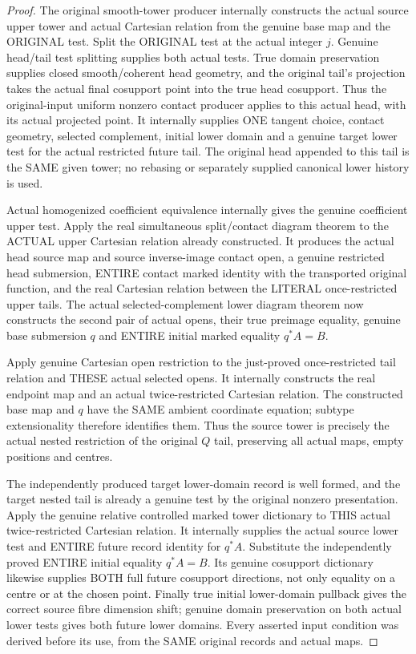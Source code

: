 \begin{proof}
The original smooth-tower producer internally constructs the actual source
upper tower and actual Cartesian relation from the genuine base map and the
ORIGINAL test. Split the ORIGINAL test at the actual integer $j$. Genuine
head/tail test splitting supplies both actual tests. True domain preservation
supplies closed smooth/coherent head geometry, and the original tail's
projection takes the actual final cosupport point into the true head
cosupport. Thus the original-input uniform nonzero contact producer applies
to this actual head, with its actual projected point. It internally supplies
ONE tangent choice, contact geometry, selected complement, initial lower
domain and a genuine target lower test for the actual restricted future tail.
The original head appended to this tail is the SAME given tower; no rebasing
or separately supplied canonical lower history is used.

Actual homogenized coefficient equivalence internally gives the genuine
coefficient upper test. Apply the real simultaneous split/contact diagram
theorem to the ACTUAL upper Cartesian relation already constructed. It
produces the actual head source map and source inverse-image contact open,
a genuine restricted head submersion, ENTIRE contact marked identity with
the transported original function, and the real Cartesian relation between
the LITERAL once-restricted upper tails. The actual selected-complement
lower diagram theorem now constructs the second pair of actual opens, their
true preimage equality, genuine base submersion $q$ and ENTIRE initial
marked equality $q^*A=B$.

Apply genuine Cartesian open restriction to the just-proved once-restricted
tail relation and THESE actual selected opens. It internally constructs the
real endpoint map and an actual twice-restricted Cartesian relation. The
constructed base map and $q$ have the SAME ambient coordinate equation;
subtype extensionality therefore identifies them. Thus the source tower is
precisely the actual nested restriction of the original $Q$ tail, preserving
all actual maps, empty positions and centres.

The independently produced target lower-domain record is well formed, and
the target nested tail is already a genuine test by the original nonzero
presentation. Apply the genuine relative controlled marked tower dictionary
to THIS actual twice-restricted Cartesian relation. It internally supplies
the actual source lower test and ENTIRE future record identity for $q^*A$.
Substitute the independently proved ENTIRE initial equality $q^*A=B$.
Its genuine cosupport dictionary likewise supplies BOTH full future
cosupport directions, not only equality on a centre or at the chosen point.
Finally true initial lower-domain pullback gives the correct source fibre
dimension shift; genuine domain preservation on both actual lower tests
gives both future lower domains. Every asserted input condition was derived
before its use, from the SAME original records and actual maps.


\end{proof}
